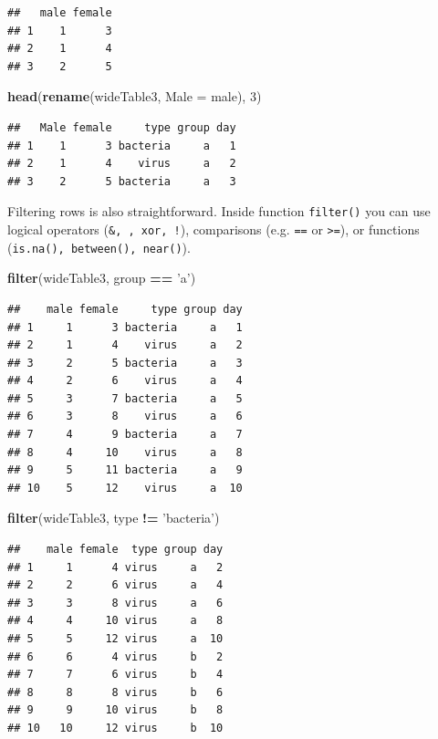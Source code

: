 \documentclass[]{book}
\newenvironment{Shaded}{\begin{snugshade}}{\end{snugshade}}
\newcommand{\KeywordTok}[1]{\textcolor[rgb]{0.13,0.29,0.53}{\textbf{#1}}}
\newcommand{\DataTypeTok}[1]{\textcolor[rgb]{0.13,0.29,0.53}{#1}}
\newcommand{\DecValTok}[1]{\textcolor[rgb]{0.00,0.00,0.81}{#1}}
\newcommand{\StringTok}[1]{\textcolor[rgb]{0.31,0.60,0.02}{#1}}
\newcommand{\OperatorTok}[1]{\textcolor[rgb]{0.81,0.36,0.00}{\textbf{#1}}}
\newcommand{\NormalTok}[1]{#1}
\theoremstyle{definition}
\theoremstyle{definition}
\theoremstyle{definition}
\theoremstyle{remark}
\begin{document}
\begin{verbatim}
##   male female
## 1    1      3
## 2    1      4
## 3    2      5
\end{verbatim}

\begin{Shaded}
\begin{Highlighting}[]
\KeywordTok{head}\NormalTok{(}\KeywordTok{rename}\NormalTok{(wideTable3, }\DataTypeTok{Male =}\NormalTok{ male), }\DecValTok{3}\NormalTok{)}
\end{Highlighting}
\end{Shaded}

\begin{verbatim}
##   Male female     type group day
## 1    1      3 bacteria     a   1
## 2    1      4    virus     a   2
## 3    2      5 bacteria     a   3
\end{verbatim}

Filtering rows is also straightforward. Inside function
\texttt{filter()} you can use logical operators
(\texttt{\&,\ \textbar{},\ xor,\ !}), comparisons (e.g. \texttt{==} or
\texttt{\textgreater{}=}), or functions
(\texttt{is.na(),\ between(),\ near()}).

\begin{Shaded}
\begin{Highlighting}[]
\KeywordTok{filter}\NormalTok{(wideTable3, group }\OperatorTok{==}\StringTok{ 'a'}\NormalTok{)}
\end{Highlighting}
\end{Shaded}

\begin{verbatim}
##    male female     type group day
## 1     1      3 bacteria     a   1
## 2     1      4    virus     a   2
## 3     2      5 bacteria     a   3
## 4     2      6    virus     a   4
## 5     3      7 bacteria     a   5
## 6     3      8    virus     a   6
## 7     4      9 bacteria     a   7
## 8     4     10    virus     a   8
## 9     5     11 bacteria     a   9
## 10    5     12    virus     a  10
\end{verbatim}

\begin{Shaded}
\begin{Highlighting}[]
\KeywordTok{filter}\NormalTok{(wideTable3, type }\OperatorTok{!=}\StringTok{ 'bacteria'}\NormalTok{)}
\end{Highlighting}
\end{Shaded}

\begin{verbatim}
##    male female  type group day
## 1     1      4 virus     a   2
## 2     2      6 virus     a   4
## 3     3      8 virus     a   6
## 4     4     10 virus     a   8
## 5     5     12 virus     a  10
## 6     6      4 virus     b   2
## 7     7      6 virus     b   4
## 8     8      8 virus     b   6
## 9     9     10 virus     b   8
## 10   10     12 virus     b  10
\end{verbatim}
\end{document}
